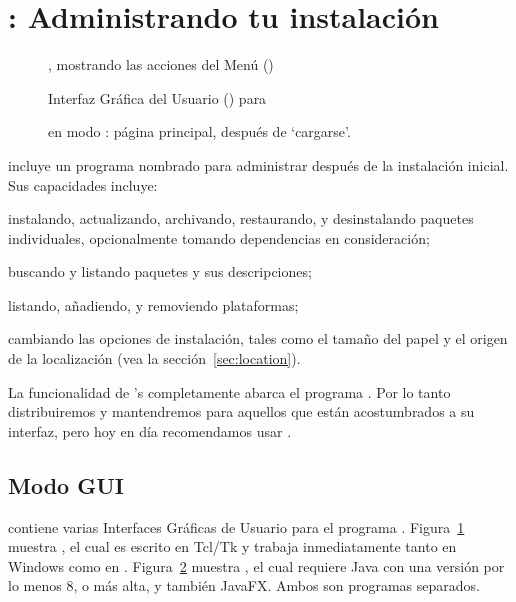 \documentclass{article}
\begin{document}
\section{: Administrando tu instalación}
\label{sec:tlmgr}

\begin{figure}[tb]
\caption{ \GUI, mostrando las acciones del
	Menú (\MacOSX)}
\label{fig:tlshell}
\end{figure}

\begin{figure}[tb]
	\caption{ Interfaz Gráfica del Usuario (\GUI{}) para }
\label{fig:tlcockpit}
\end{figure}

\begin{figure}[tb]
\caption{ en modo \GUI: página principal, después de
`cargarse'.}
\label{fig:tlmgr-gui}
\end{figure}

\TL{} incluye un programa nombrado  para administrar \TL{}
después de la instalación inicial. Sus capacidades incluye:

\begin{itemize*}
\item instalando, actualizando, archivando, restaurando, y
	desinstalando paquetes individuales, opcionalmente tomando
	dependencias en consideración;
\item buscando y listando paquetes y sus descripciones;
\item listando, añadiendo, y removiendo plataformas;
\item cambiando las opciones de instalación, tales como el tamaño del
	papel y el origen de la localización (vea la
	sección~\ref{sec:location}).
\end{itemize*}

La funcionalidad de 's completamente abarca el programa
. Por lo tanto distribuiremos y mantendremos  para
aquellos que están acostumbrados a su interfaz, pero hoy en día
recomendamos usar . 

\subsection{ Modo GUI}

\TL{} contiene varias Interfaces Gráficas de Usuario \GUI
para el programa . Figura~\ref{fig:tlshell}
muestra , el cual es escrito en Tcl/Tk y
trabaja inmediatamente tanto en Windows como en \MacOSX.
Figura~\ref{fig:tlcockpit} muestra , el cual
requiere Java con una versión por lo menos 8, o más alta, y
también JavaFX. Ambos son programas separados.
\end{document}

